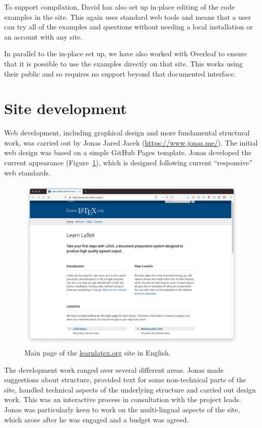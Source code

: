 \documentclass[a4paper]{article}
\begin{document}
To support compilation, David has also set up in-place editing of the code
examples in the site. This again uses standard web tools and means that a user
can try all of the examples and questions without needing a local installation
or an account with any site.

In parallel to the in-place set up, we have also worked with Overleaf to ensure
that it is possible to use the examples directly on that site. This works using
their public  and so requires no support beyond that documented
interface.

\section{Site development}

Web development, including graphical design and more fundamental structural
work, was carried out by Jonas Jared Jacek (\url{https://www.jonas.me/}). The
initial web design was based on a simple GitHub Pages template. Jonas developed
the current appearance (Figure~\ref{fgr:site}), which is designed following
current \enquote{responsive} web standards.
\begin{figure}
  \includegraphics[width = \textwidth]{learnlatex-screenshot}
  \caption{Main page of the \url{learnlatex.org} site in English.\label{fgr:site}}
\end{figure}

The development work ranged over several different areas. Jonas made
suggestions about structure, provided text for some non-technical parts of the
site, handled technical aspects of the underlying structure and carried out
design work. This was an interactive process in consultation with the project
leads. Jonas was particularly keen to work on the multi-lingual aspects of
the site, which arose after he was engaged and a budget was agreed.
\end{document}
